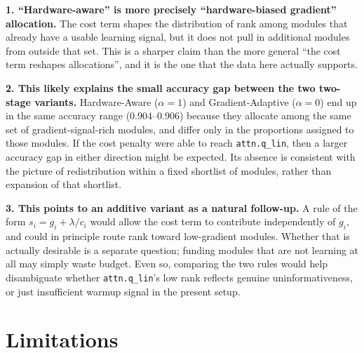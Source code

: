 \documentclass{article}
\begin{document}
\textbf{1. ``Hardware-aware'' is more precisely ``hardware-biased
gradient'' allocation.} The cost term shapes the distribution of rank
among modules that already have a usable learning signal, but it does
not pull in additional modules from outside that set. This is a
sharper claim than the more general ``the cost term reshapes
allocations'', and it is the one that the data here actually supports.

\textbf{2. This likely explains the small accuracy gap between the two
two-stage variants.} Hardware-Aware ($\alpha = 1$) and
Gradient-Adaptive ($\alpha = 0$) end up in the same accuracy range
($0.904$--$0.906$) because they allocate among the same set of
gradient-signal-rich modules, and differ only in the proportions
assigned to those modules. If the cost penalty were able to reach
\texttt{attn.q\_lin}, then a larger accuracy gap in either direction
might be expected. Its absence is consistent with the picture of
redistribution within a fixed shortlist of modules, rather than
expansion of that shortlist.

\textbf{3. This points to an additive variant as a natural follow-up.}
A rule of the form $s_i = g_i + \lambda / c_i$ would allow the cost
term to contribute independently of $g_i$, and could in principle
route rank toward low-gradient modules. Whether that is actually
desirable is a separate question; funding modules that are not
learning at all may simply waste budget. Even so, comparing the two
rules would help disambiguate whether \texttt{attn.q\_lin}'s low rank
reflects genuine uninformativeness, or just insufficient warmup
signal in the present setup.

\section{Limitations}
\label{sec:limitations}
\end{document}

